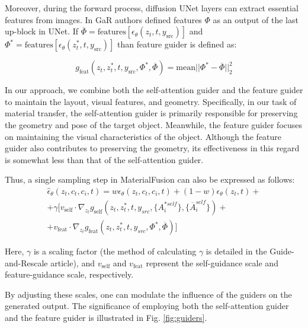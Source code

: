 Moreover, during the forward process, diffusion UNet layers can extract essential features from images.  In GaR authors defined
features $\Phi$ as an output of the last up-block in UNet. If $\overline{\Phi} = \mathrm{features}[\epsilon_\theta(z_t, t, y_{\mathrm{src}})]$ and $\Phi^* = \mathrm{features}[\epsilon_\theta(z^*_t, t, y_{\mathrm{src}})]$ than feature guider is defined as:

\begin{equation}
g_{\mathrm{feat}}(z_t, z_t^*, t, y_{\mathrm{src}}, \Phi^{*}, \overline{\Phi}) = \mathrm{mean}||\Phi^*-\overline{\Phi}||_2^2
  \label{eq:feature-guider-eq}
\end{equation}




In our approach, we combine both the self-attention guider and the feature guider to maintain the layout, visual features, and geometry. Specifically, in our task of material transfer, the self-attention guider is primarily responsible for preserving the geometry and pose of the target object. Meanwhile, the feature guider focuses on maintaining the visual characteristics of the object. Although the feature guider also contributes to preserving the geometry, its effectiveness in this regard is somewhat less than that of the self-attention guider.

Thus, a single sampling step in MaterialFusion can also be expressed as follows:
\begin{equation}
\begin{split}
  \hat{\epsilon}_{\theta}(z_{t}, c_t, c_i, t) = w\epsilon_{\theta}(z_{t}, c_t, c_i, t) + (1-w)\epsilon_{\theta}(z_{t}, t) + \\  + \gamma[v_{\mathrm{self}} \cdot \nabla_{z_t}g_{\mathrm{self}}(z_t, z_t^*, t, y_{src}, \{A_i^{*self}\}, \{\overline{A}_i^{self}\}) + \\ 
  + v_{\mathrm{feat}} \cdot \nabla_{z_t}g_{\mathrm{feat}}(z_t, z_t^*, t, y_{src}, \Phi^{*}, \overline{\Phi})]
  \label{eq:material-sampling}
\end{split}
\end{equation}

Here, $\gamma$ is a scaling factor (the method of calculating $\gamma$ is detailed in the Guide-and-Rescale article), and $v_{\mathrm{self}}$ and $v_{\mathrm{feat}}$ represent the self-guidance scale and feature-guidance scale, respectively.

By adjusting these scales, one can modulate the influence of the guiders on the generated output. The significance of employing both the self-attention guider and the feature guider is illustrated in Fig. \ref{fig:guiders}.


